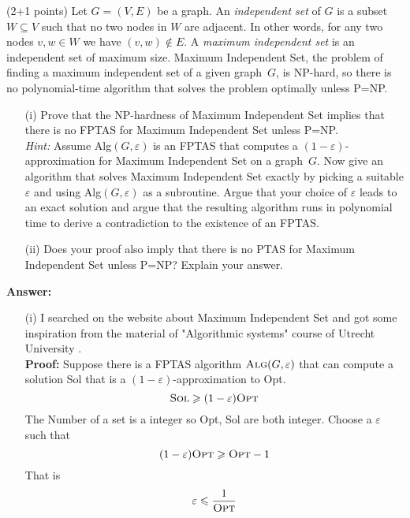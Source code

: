 \documentclass{article}
\newcommand{\eps}{\varepsilon}
\renewcommand{\leq}{\leqslant}
\renewcommand{\geq}{\geqslant}
\newcounter{rcounter}
\newenvironment{rlist}%
{\begin{list}{\setnr-\arabic{rcounter}}{\usecounter{rcounter}}}{\end{list}}
\begin{document}
\begin{rlist}
        \item (2+1 points)
        Let $G=(V,E)$ be a graph. An \emph{independent set} of $G$ is a subset $W\subseteq V$
        such that no two nodes in $W$ are adjacent. In other words, for any two nodes $v,w\in W$ we
        have $(v,w)\not\in E$. A \emph{maximum independent set} is an independent set of maximum size.
        {\sc Maximum Independent Set}, the problem of finding a maximum independent set of a
        given graph~$G$, is NP-hard, so there is no polynomial-time algorithm that solves the
        problem optimally unless P=NP.
        \begin{enumerate}
            \item[(i)]
            Prove that the NP-hardness of {\sc Maximum Independent Set} implies that there is 
            no FPTAS for {\sc Maximum Independent Set} unless P=NP.
            \\[2mm]
            \emph{Hint:} Assume {\sc Alg}$(G,\eps)$ is an FPTAS that computes a $(1-\eps)$-approximation
            for {\sc Maximum Independent Set} on a graph~$G$. Now give an algorithm that solves
            {\sc Maximum Independent Set} exactly by picking a suitable $\eps$ and using
            {\sc Alg}$(G,\eps)$ as a subroutine. Argue that your choice of $\eps$ leads to
            an exact solution and argue that the resulting algorithm runs in polynomial time
            to derive a contradiction to the existence of an FPTAS.
            \item[(ii)]
            Does your proof also imply that there is no PTAS for {\sc Maximum Independent Set} unless P=NP? Explain your answer.
        \end{enumerate}
        \textbf{Answer:}
        \begin{enumerate}
            \item[(i)] I searched on the website about {\sc Maximum Independent Set} and got some inspiration from the material of
            "Algorithmic systems" course of Utrecht University \cite{uuAAcourse}.\\
            \textbf{Proof:} Suppose there is a FPTAS algorithm $\textrm{\sc Alg}(G, \varepsilon)$ that can compute a solution
            {\sc Sol} that is a $(1-\eps)$-approximation to {\sc Opt}.
            $$\textrm{\sc Sol} \geq (1-\eps)\textrm{\sc Opt}$$
            The Number of a set is a integer so {\sc Opt, Sol} are both integer. Choose a $\eps$ such that 
            $$(1-\eps)\textrm{\sc Opt} \geq \textrm{\sc Opt}-1$$
            That is $$\eps \leq \frac{1}{\textrm{\sc Opt}}$$

\end{enumerate}
\end{rlist}
\end{document}
